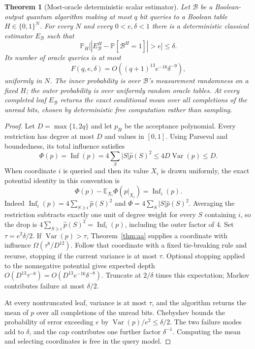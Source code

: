 \documentclass[11pt]{article}
\newtheorem{theorem}{Theorem}[section]
\theoremstyle{definition}\newtheorem{definition}[theorem]{Definition}
\theoremstyle{remark}\newtheorem{remark}[theorem]{Remark}
\newcommand{\E}{\mathbb E}\newcommand{\Prb}{\mathbb P}
\newcommand{\mc}{\mathcal}\newcommand{\eps}{\varepsilon}
\DeclareMathOperator{\Inf}{Inf}\DeclareMathOperator{\Var}{Var}
\begin{document}
\begin{theorem}[Most-oracle deterministic scalar estimator]\label{thm:scalar}
Let \(\mc B\) be a Boolean-output quantum algorithm making at most \(q\) bit queries to a Boolean table \(H\in\{0,1\}^N\). For every \(N\) and every \(0<e,\delta<1\) there is a deterministic classical estimator \(E_{\mc B}\) such that
\[
 \Prb_H\bigl[|E^H_{\mc B}-\Prb[\mc B^H=1]|>e\bigr]\le\delta.
\]
Its number of oracle queries is at most
\[
 F(q,e,\delta)=O((q+1)^{13}e^{-16}\delta^{-9}),
\]
uniformly in \(N\). The inner probability is over \(\mc B\)'s measurement randomness on a fixed \(H\); the outer probability is over uniformly random oracle tables. At every completed leaf \(E_{\mc B}\) returns the exact conditional mean over all completions of the unread bits, chosen by deterministic free computation rather than sampling.
\end{theorem}
\begin{proof}
Let \(D=\max\{1,2q\}\) and let \(p_H\) be the acceptance polynomial. Every restriction has degree at most \(D\) and values in \([0,1]\). Using Parseval and boundedness, its total influence satisfies
\[
 \Phi(p)=\Inf(p)=4\sum_S|S|\hat p(S)^2\le4D\Var(p)\le D.
\]
When coordinate \(i\) is queried and then its value \(X_i\) is drawn uniformly, the exact potential identity in this convention is
\[
 \Phi(p)-\E_{X_i}\Phi(p|_{X_i})=\Inf_i(p).
\]
Indeed \(\Inf_i(p)=4\sum_{S\ni i}\hat p(S)^2\) and \(\Phi=4\sum_S|S|\hat p(S)^2\). Averaging the restriction subtracts exactly one unit of degree weight for every \(S\) containing \(i\), so the drop is \(4\sum_{S\ni i}\hat p(S)^2=\Inf_i(p)\), including the outer factor of 4. Set \(\tau=e^2\delta/2\). If \(\Var(p)>\tau\), Theorem~\ref{thm:aa} supplies a coordinate with influence \(\Omega(\tau^8/D^{12})\). Follow that coordinate with a fixed tie-breaking rule and recurse, stopping if the current variance is at most \(\tau\). Optional stopping applied to the nonnegative potential gives expected depth \(O(D^{13}\tau^{-8})=O(D^{13}e^{-16}\delta^{-8})\). Truncate at \(2/\delta\) times this expectation; Markov contributes failure at most \(\delta/2\).

At every nontruncated leaf, variance is at most \(\tau\), and the algorithm returns the mean of \(p\) over all completions of the unread bits. Chebyshev bounds the probability of error exceeding \(e\) by \(\Var(p)/e^2\le\delta/2\). The two failure modes add to \(\delta\), and the cap contributes one further factor \(\delta^{-1}\). Computing the mean and selecting coordinates is free in the query model.
\end{proof}
\end{document}
